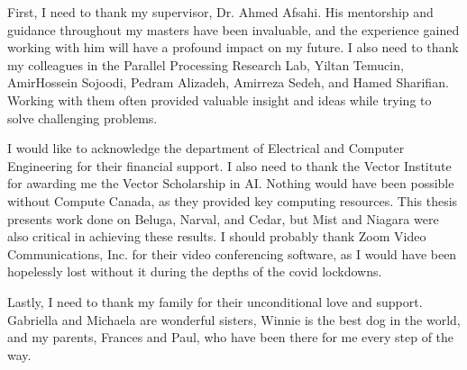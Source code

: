 {}

First, I need to thank my supervisor, Dr. Ahmed Afsahi.
His mentorship and guidance throughout my masters have been invaluable, and the experience gained working with him will have a profound impact on my future. 
I also need to thank my colleagues in the Parallel Processing Research Lab, Yiltan Temucin, AmirHossein Sojoodi, Pedram Alizadeh, Amirreza Sedeh, and Hamed Sharifian.
Working with them often provided valuable insight and ideas while trying to solve challenging problems.

I would like to acknowledge the department of Electrical and Computer Engineering for their financial support.
I also need to thank the Vector Institute for awarding me the Vector Scholarship in AI. 
Nothing would have been possible without Compute Canada, as they provided key computing resources.
This thesis presents work done on Beluga, Narval, and Cedar, but Mist and Niagara were also critical in achieving these results. I should probably thank Zoom Video Communications, Inc. for their video conferencing software, as I would have been hopelessly lost without it during the depths of the covid lockdowns.

Lastly, I need to thank my family for their unconditional love and support. 
Gabriella and Michaela are wonderful sisters, Winnie is the best dog in the world, and my parents, Frances and Paul, who have been there for me every step of the way.


\clearpage %